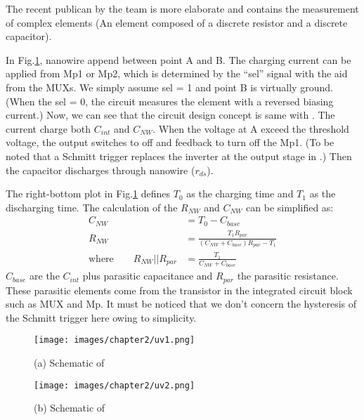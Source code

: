 The recent publican \cite{Juv2} by the team is more elaborate and contains the measurement of complex elements (An element composed of a discrete resistor and a discrete capacitor).

In Fig.\ref{fig:tot2}, nanowire append between point A and B.
The charging current can be applied from Mp1 or Mp2, which is determined by the ``sel'' signal with the aid from the MUXs.
We simply assume sel = 1 and point B is virtually ground.
(When the sel = 0, the circuit measures the element with a reversed biasing current.)
Now, we can see that the circuit design concept is same with \cite{Juv1}.
The current charge both $C_{int}$ and $C_{NW}$.
When the voltage at A exceed the threshold voltage, the output switches to off and feedback to turn off the Mp1.
(To be noted that a Schmitt trigger replaces the inverter at the output stage in \cite{Juv1}.)
Then the capacitor discharges through nanowire ($r_{ds}$).

The right-bottom plot in Fig.\ref{fig:tot2} defines $T_0$ as the charging time and $T_1$ as the discharging time.
The calculation of the $R_{NW}$ and $C_{NW}$  can be simplified as:
\setlength{\mathindent}{2cm}
\begin{align}
                         C_{NW}            & = T_0 - C_{base}\\
                         R_{NW}            & = \frac{T_1R_{par}}{(C_{NW} + C_{base})R_{par} - T_1}\\
    \text{where} \qquad  R_{NW} || R_{par} & = \frac{T_1}{C_{NW} + C_{base}}
\end{align}
$C_{base}$ are the $C_{int}$ plus parasitic capacitance and $R_{par}$ the parasitic resistance.
These parasitic elements come from the transistor in the integrated circuit block such as MUX and Mp.
It must be noticed that we don't concern the hysteresis of the Schmitt trigger here owing to simplicity.

\begin{figure}[!htbp]
    \begin{minipage}[t][0.1\textheight]{0.6\textwidth}
        \centering
        \texttt{[image: images/chapter2/uv1.png]}
        \caption{(a) Schematic of \cite{Juv1}}
        \label{fig:tot1}
    \end{minipage}
    \hfill
    \begin{minipage}[t][0.1\textheight]{0.4\textwidth}
        \centering
        \texttt{[image: images/chapter2/uv2.png]}
        \caption{(b) Schematic of \cite{Juv2}}
        \label{fig:tot2}
    \end{minipage}
    \fontsize{6}{7}\selectfont
\end{figure}

